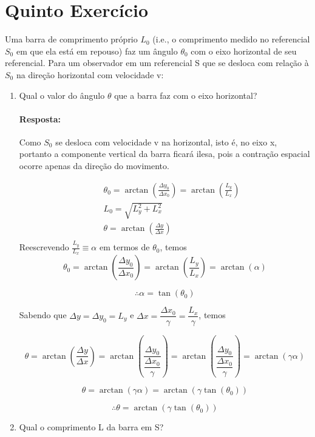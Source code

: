 \documentclass[10pt,a4paper]{article}
\begin{document}
	\section{Quinto Exercício}
	Uma barra de comprimento próprio $ L_0 $ (i.e., o comprimento medido no referencial $ S_0 $ em que ela está em repouso) faz um ângulo $ \theta_0 $ com o eixo
	horizontal de seu referencial. Para um observador em um referencial S que se desloca com relação à $ S_0 $ na direção horizontal com velocidade v:
	\begin{enumerate}
		\item Qual o valor do ângulo $ \theta $ que a barra faz com o eixo horizontal?
		
		\paragraph{Resposta:}
		Como $ S_0 $ se desloca com velocidade v na horizontal, isto é, no eixo x, portanto a componente vertical da barra ficará ilesa, pois a contração espacial ocorre apenas da direção do movimento.
		
		\begin{eqnarray}
			&& \theta_0 = \arctan\left(\frac{\Delta y_0}{\Delta x_0}\right) = \arctan\left(\frac{L_y}{L_x}\right)\nonumber \\
			&& L_0 = \sqrt{L_y^2+L_x^2} \nonumber\\
			&& \theta = \arctan\left(\frac{\Delta y}{\Delta x}\right) \nonumber \\
		\end{eqnarray}
		 Reescrevendo $ \frac{L_y}{L_x} \equiv \alpha$ em termos de $ \theta_0 $, temos
		 $$\theta_0 = \arctan\left(\frac{\Delta y_0}{\Delta x_0}\right) = \arctan\left(\frac{L_y}{L_x}\right) =  \arctan (\alpha)$$
		 
		 $$\therefore \alpha = \tan (\theta_0)$$
		 
		 Sabendo que $ \Delta y = \Delta y_0 = L_y $ e $\Delta x = \dfrac{\Delta x_0}{\gamma} =\dfrac{L_x}{\gamma} $, temos
		 
		 $$ \theta = \arctan\left(\frac{\Delta y}{\Delta x}\right) = \arctan\left(\frac{\Delta y_0}{ \dfrac{\Delta x_0}{\gamma}}\right) =\arctan\left(\frac{\Delta y_0}{ \dfrac{\Delta x_0}{\gamma}}\right) = \arctan(\gamma\alpha)$$
		 
		 $$\theta = \arctan(\gamma\alpha) = \arctan(\gamma\tan (\theta_0))$$
		 
		$$ \therefore \theta  = \arctan(\gamma\tan (\theta_0))$$
		
		\item Qual o comprimento L da barra em S?

\end{enumerate}
\end{document}
